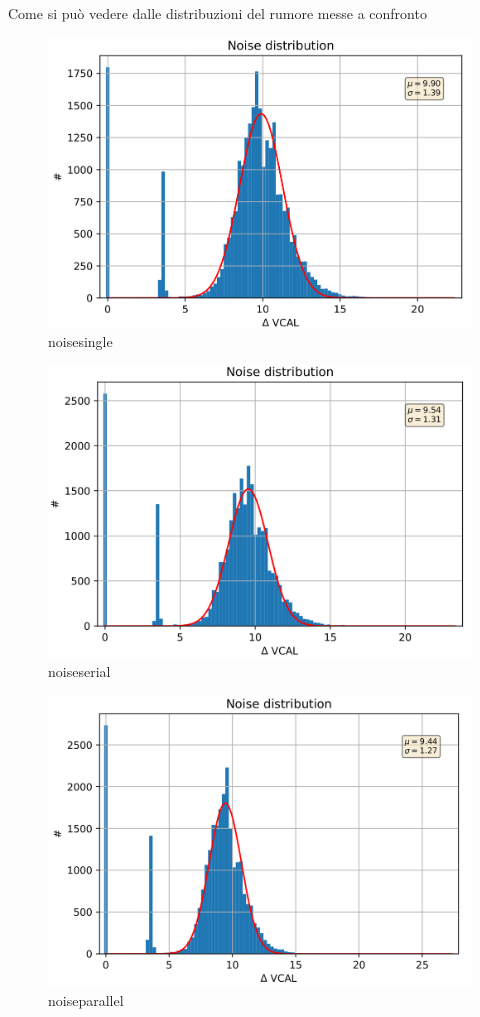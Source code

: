 Come si può vedere dalle distribuzioni del rumore messe a confronto
\begin{figure}
\centering
\includegraphics[scale=.3]{Immagini/NoiseSingle}
\caption{noisesingle}
\label{noisesingle}
\end{figure}

\begin{figure}
\centering
\includegraphics[scale=.3]{Immagini/NoiseSerial}
\caption{noiseserial}
\label{noiseserial}
\end{figure}

\begin{figure}
\centering
\includegraphics[scale=.3]{Immagini/NoiseParallel}
\caption{noiseparallel}
\label{noiseparallel}
\end{figure}